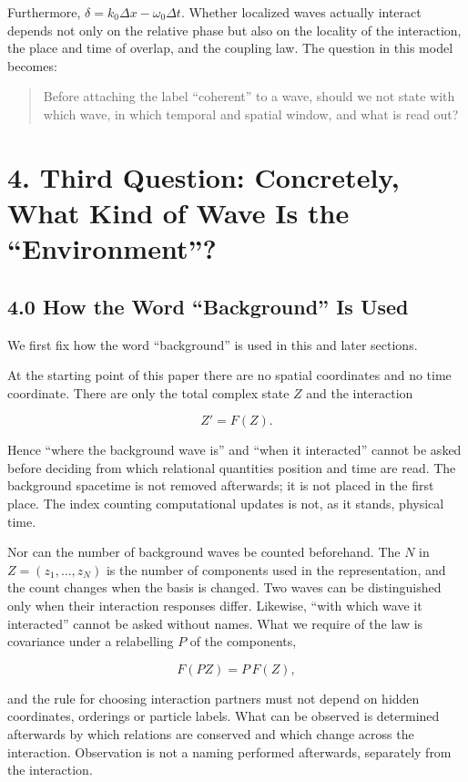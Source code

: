 \documentclass[
  a4paper,
]{article}
\begin{document}
Furthermore, \(\delta=k_0\Delta x-\omega_0\Delta t\). Whether localized
waves actually interact depends not only on the relative phase but also
on the locality of the interaction, the place and time of overlap, and
the coupling law. The question in this model becomes:

\begin{quote}
Before attaching the label ``coherent'' to a wave, should we not state
with which wave, in which temporal and spatial window, and what is read
out?
\end{quote}

\section{4. Third Question: Concretely, What Kind of Wave Is the
``Environment''?}\label{third-question-concretely-what-kind-of-wave-is-the-environment}

\subsection{4.0 How the Word ``Background'' Is
Used}\label{how-the-word-background-is-used}

We first fix how the word ``background'' is used in this and later
sections.

At the starting point of this paper there are no spatial coordinates and
no time coordinate. There are only the total complex state \(Z\) and the
interaction

\[
Z'=F(Z).
\]

Hence ``where the background wave is'' and ``when it interacted'' cannot
be asked before deciding from which relational quantities position and
time are read. The background spacetime is not removed afterwards; it is
not placed in the first place. The index counting computational updates
is not, as it stands, physical time.

Nor can the number of background waves be counted beforehand. The \(N\)
in \(Z=(z_1,\ldots,z_N)\) is the number of components used in the
representation, and the count changes when the basis is changed. Two
waves can be distinguished only when their interaction responses differ.
Likewise, ``with which wave it interacted'' cannot be asked without
names. What we require of the law is covariance under a relabelling
\(P\) of the components,

\[
F(PZ)=P\,F(Z),
\]

and the rule for choosing interaction partners must not depend on hidden
coordinates, orderings or particle labels. What can be observed is
determined afterwards by which relations are conserved and which change
across the interaction. Observation is not a naming performed
afterwards, separately from the interaction.
\end{document}
